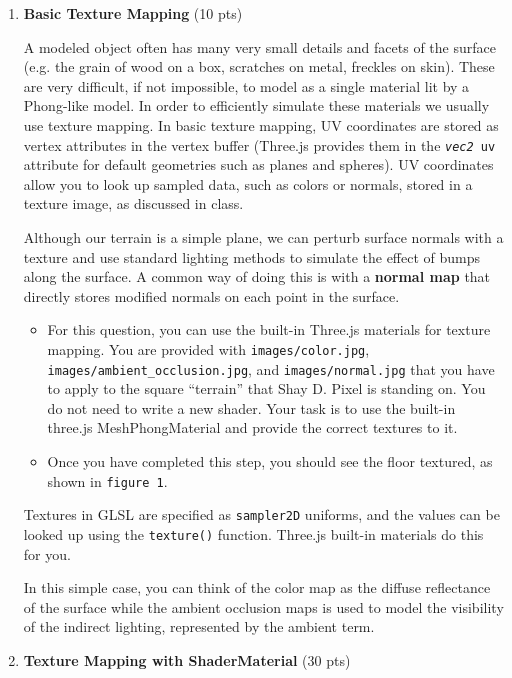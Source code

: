 \documentclass[12pt]{exam}
\begin{document}
\begin{enumerate}

\item \textbf{Basic Texture Mapping} (10 pts)

  A modeled object often has many very small details and facets of the surface (e.g. the grain of wood on a box, scratches on metal, freckles on skin). These are very difficult, if not impossible, to model as a single material lit by a Phong-like model. In order to efficiently simulate these materials we usually use texture mapping. In basic texture mapping, UV coordinates are stored as vertex attributes in the vertex buffer (Three.js provides them in the \texttt{\textit{vec2} uv} attribute for default geometries such as planes and spheres). UV coordinates allow you to look up sampled data, such as colors or normals, stored in a texture image, as discussed in class.

Although our terrain is a simple plane, we can perturb surface normals with a texture and use standard lighting methods to simulate the effect of bumps along the surface. A common way of doing this is with a \textbf{normal map} that directly stores modified normals on each point in the surface.
\begin{itemize}
    \item 

For this question, you can use the built-in Three.js materials for texture mapping. You are provided with \texttt{images/color.jpg}, \texttt{images/ambient\_occlusion.jpg}, and \texttt{images/normal.jpg} that you have to apply to the square ``terrain'' that Shay D. Pixel is standing on. You do not need to write a new shader. Your task is to use the built-in three.js MeshPhongMaterial and provide the correct textures to it.
\item Once you have completed this step, you should see the floor textured, as shown in  \texttt{figure 1}.
\end{itemize}

Textures in GLSL are specified as \texttt{sampler2D} uniforms, and the values can be looked up using the \texttt{texture()} function. Three.js built-in materials do this for you.

In this simple case, you can think of the color map as the diffuse reflectance of the surface while the ambient occlusion maps is used to model the visibility of the indirect lighting, represented by the ambient term.

\item \textbf{Texture Mapping with ShaderMaterial} (30 pts)


\end{enumerate}
\end{document}
